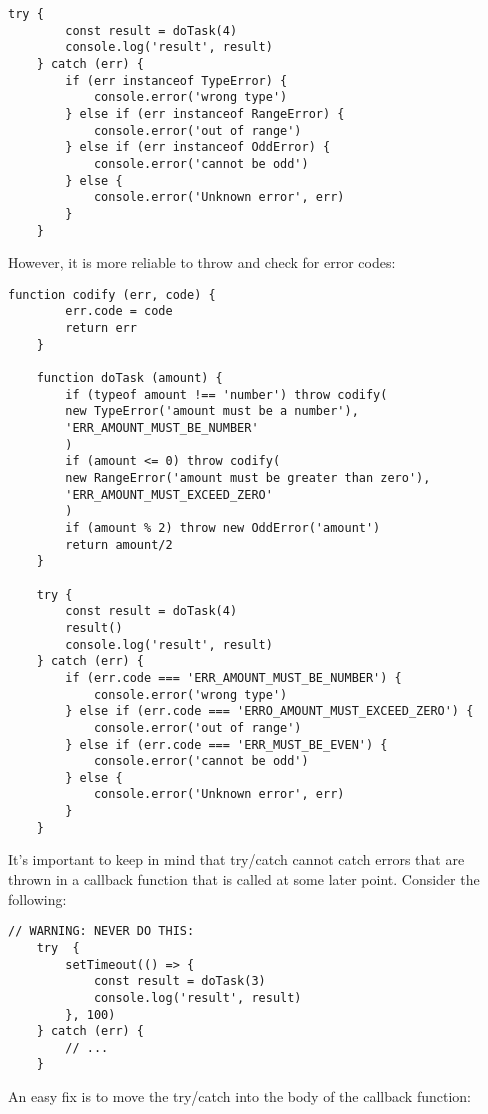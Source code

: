 \documentclass{scrartcl}
\begin{document}
\begin{lstlisting}[style=ES6]
    try {
        const result = doTask(4)
        console.log('result', result)
    } catch (err) {
        if (err instanceof TypeError) {
            console.error('wrong type')
        } else if (err instanceof RangeError) {
            console.error('out of range')
        } else if (err instanceof OddError) {
            console.error('cannot be odd')
        } else {
            console.error('Unknown error', err)
        }
    }
\end{lstlisting}

However, it is more reliable to throw and check for error codes:

\begin{lstlisting}[style=ES6]
    function codify (err, code) {
        err.code = code
        return err
    }

    function doTask (amount) {
        if (typeof amount !== 'number') throw codify(
        new TypeError('amount must be a number'),
        'ERR_AMOUNT_MUST_BE_NUMBER'
        )
        if (amount <= 0) throw codify(
        new RangeError('amount must be greater than zero'),
        'ERR_AMOUNT_MUST_EXCEED_ZERO'
        )
        if (amount % 2) throw new OddError('amount')
        return amount/2
    }

    try {
        const result = doTask(4)
        result()
        console.log('result', result)
    } catch (err) {
        if (err.code === 'ERR_AMOUNT_MUST_BE_NUMBER') {
            console.error('wrong type')
        } else if (err.code === 'ERRO_AMOUNT_MUST_EXCEED_ZERO') {
            console.error('out of range')
        } else if (err.code === 'ERR_MUST_BE_EVEN') {
            console.error('cannot be odd')
        } else {
            console.error('Unknown error', err)
        }
    }
\end{lstlisting}

It's important to keep in mind that try/catch cannot catch errors that are thrown in a callback function that is called at some later point. Consider the following:

\begin{lstlisting}[style=ES6]
    // WARNING: NEVER DO THIS:
    try  {
        setTimeout(() => {
            const result = doTask(3)
            console.log('result', result)
        }, 100)
    } catch (err) {
        // ...
    }
\end{lstlisting}

An easy fix is to move the try/catch into the body of the callback function:
\end{document}
